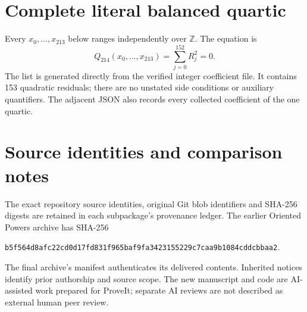 \documentclass[11pt]{article}
\newcommand{\Z}{\mathbb Z}
\begin{document}
\appendix

\clearpage
\section{Complete literal balanced quartic}\label{app:quartic}

Every $x_0,\ldots,x_{213}$ below ranges independently over $\Z$.
The equation is
\[
 \boxed{Q_{214}(x_0,\ldots,x_{213})=\sum_{j=0}^{152}R_j^2=0.}
\]
The list is generated directly from the verified integer coefficient file.
It contains 153 quadratic residuals; there are no unstated side
conditions or auxiliary quantifiers. The adjacent JSON also records
every collected coefficient of the one quartic.



\clearpage
\section{Source identities and comparison notes}

The exact repository source identities, original Git blob identifiers and
SHA-256 digests are retained in each subpackage's provenance ledger.
The earlier Oriented Powers archive has SHA-256
\begin{center}
\small\texttt{b5f564d8afc22cd0d17fd831f965baf9fa3423155229c7caa9b1084cddcbbaa2}.
\end{center}
The final archive's manifest authenticates its delivered contents.
Inherited notices identify prior authorship and source scope.
The new manuscript and code are AI-assisted work prepared for ProveIt;
separate AI reviews are not described as external human peer review.
\end{document}
